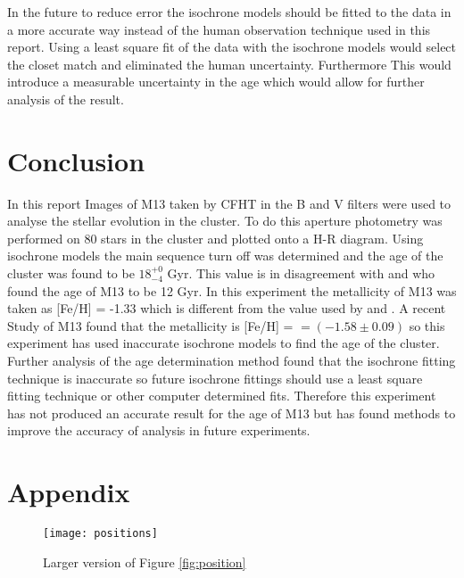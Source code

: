 \documentclass[10pt]{article}
\begin{document}
In the future to reduce error the isochrone models should be fitted to the data in a more accurate way instead of the human observation technique used in this report. Using a least square fit of the data with the isochrone models would select the closet match and eliminated the human uncertainty. Furthermore This would introduce a measurable uncertainty in the age which would allow for further analysis of the result. 

\section{Conclusion}
In this report Images of M13 taken by CFHT in the B and V filters were used to analyse the stellar evolution in the cluster. To do this aperture photometry was performed on 80 stars in the cluster and plotted onto a H-R diagram. Using isochrone models the main sequence turn off was determined and the age of the cluster was found to be $18^{+0}_{-4}$ Gyr. This value is in disagreement with \citet{VandenBerg_2013} and \citet{Grundahl_1998} who found the age of M13 to be 12 Gyr. In this experiment the metallicity of M13 was taken as [Fe/H] = -1.33 which is different from the value used by \citet{VandenBerg_2013} and \citet{Grundahl_1998}. A recent Study of M13 found that the metallicity is [Fe/H] = $=(-1.58 \pm 0.09)$ \citep{deras} so this experiment has used inaccurate isochrone models to find the age of the cluster. Further analysis of the age determination method found that the isochrone fitting technique is inaccurate so future isochrone fittings should use a least square fitting technique or other computer determined fits. Therefore this experiment has not produced an accurate result for the age of M13 but has found methods to improve the accuracy of analysis in future experiments.




\pagebreak
\section*{Appendix}
\begin{figure}[H]
\centering
	\texttt{[image: positions]}
	\caption*{Larger version of Figure \ref{fig:position}}
\end{figure}
\end{document}
